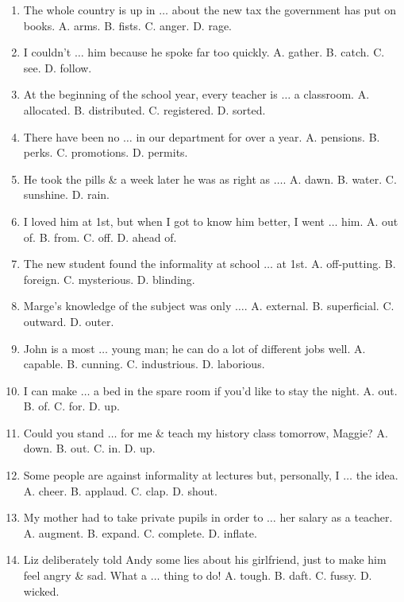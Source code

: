 \documentclass{article}
\numberwithin{equation}{section}
\begin{document}
\begin{enumerate}[leftmargin=8mm]
	\item The whole country is up in $\ldots$ about the new tax the government has put on books. {\sf A.} arms. {\sf B.} fists. {\sf C.} anger. {\sf D.} rage.
	\item I couldn't $\ldots$ him because he spoke far too quickly. {\sf A.} gather. {\sf B.} catch. {\sf C.} see. {\sf D.} follow.
	\item At the beginning of the school year, every teacher is $\ldots$ a classroom. {\sf A.} allocated. {\sf B.} distributed. {\sf C.} registered. {\sf D.} sorted.
	\item There have been no $\ldots$ in our department for over a year. {\sf A.} pensions. {\sf B.} perks. {\sf C.} promotions. {\sf D.} permits.
	\item He took the pills \& a week later he was as right as $\ldots$. {\sf A.} dawn. {\sf B.} water. {\sf C.} sunshine. {\sf D.} rain.
	\item I loved him at 1st, but when I got to know him better, I went $\ldots$ him. {\sf A.} out of. {\sf B.} from. {\sf C.} off. {\sf D.} ahead of.
	\item The new student found the informality at school $\ldots$ at 1st. {\sf A.} off-putting. {\sf B.} foreign. {\sf C.} mysterious. {\sf D.} blinding.
	\item Marge's knowledge of the subject was only $\ldots$. {\sf A.} external. {\sf B.} superficial. {\sf C.} outward. {\sf D.} outer.
	\item John is a most $\ldots$ young man; he can do a lot of different jobs well. {\sf A.} capable. {\sf B.} cunning. {\sf C.} industrious. {\sf D.} laborious.
	\item I can make $\ldots$ a bed in the spare room if you'd like to stay the night. {\sf A.} out. {\sf B.} of. {\sf C.} for. {\sf D.} up.
	\item Could you stand $\ldots$ for me \& teach my history class tomorrow, Maggie? {\sf A.} down. {\sf B.} out. {\sf C.} in. {\sf D.} up.
	\item Some people are against informality at lectures but, personally, I $\ldots$ the idea. {\sf A.} cheer. {\sf B.} applaud. {\sf C.} clap. {\sf D.} shout.
	\item My mother had to take private pupils in order to $\ldots$ her salary as a teacher. {\sf A.} augment. {\sf B.} expand. {\sf C.} complete. {\sf D.} inflate.
	\item Liz deliberately told Andy some lies about his girlfriend, just to make him feel angry \& sad. What a $\ldots$ thing to do! {\sf A.} tough. {\sf B.} daft. {\sf C.} fussy. {\sf D.} wicked.

\end{enumerate}
\end{document}
